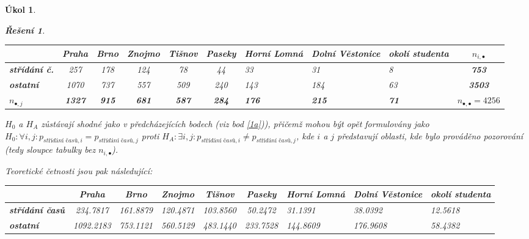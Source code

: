 \documentclass[11pt, a4paper]{article}
\theoremstyle{result}
\newtheorem*{result}{Řešení}
\newtheorem{task}{Úkol}
\begin{document}
\begin{task}
\begin{enumerate}[a)]
\begin{result}
            \begin{center}
                \begin{tabular}{ |l|c|c|c|c|c|M{1.5cm}|M{1.9cm}|M{1.8cm}|c| }
                    \hline
                    & \textbf{Praha} & \textbf{Brno} & \textbf{Znojmo} & \textbf{Tišnov} & \textbf{Paseky} & \textbf{Horní Lomná} & \textbf{Dolní Věstonice} & \textbf{okolí studenta} & \boldmath$n_{i, \bullet}$ \\
                    \hline
                    \textbf{střídání č.} & 257 & 178 & 124 & 78 & 44 & 33 & 31 & 8 & \textbf{753} \\
                    \hline
                    \textbf{ostatní} & 1070 & 737 & 557 & 509 & 240 & 143 & 184 & 63 & \textbf{3503} \\
                    \hline
                    \boldmath$n_{\bullet, j}$ & \textbf{1327} & \textbf{915} & \textbf{681} & \textbf{587} & \textbf{284} & \textbf{176} & \textbf{215} & \textbf{71} & \boldmath$n_{\bullet, \bullet} = 4256$ \\
                    \hline
                \end{tabular}
            \end{center}
        \end{result}

        $H_0$ a $H_A$ zůstávají shodné jako v předcházejících bodech (viz bod \ref{1a})), přičemž mohou být opět formulovány jako $H_0: \forall i, j: p_{\textit{střídání časů}, i} = p_{\textit{střídání časů}, j}$ proti $H_A: \exists i, j: p_{\textit{střídání časů}, i} \neq p_{\textit{střídání časů}, j}$, kde $i$ a $j$ představují oblasti, kde bylo prováděno pozorování (tedy sloupce tabulky bez $n_{i, \bullet}$).

        Teoretické četnosti jsou pak následující:

         \begin{center}
            \begin{tabular}{ |l|c|c|c|c|c|M{1.5cm}|M{1.9cm}|M{1.8cm}| }
                \hline
                & \textbf{Praha} & \textbf{Brno} & \textbf{Znojmo} & \textbf{Tišnov} & \textbf{Paseky} & \textbf{Horní Lomná} & \textbf{Dolní Věstonice} & \textbf{okolí studenta} \\
                \hline
                \textbf{střídání časů} & 234.7817 & 161.8879 & 120.4871 & 103.8560 & 50.2472 & 31.1391 & 38.0392 & 12.5618 \\
                \hline
                \textbf{ostatní} & 1092.2183 & 753.1121 & 560.5129 & 483.1440 & 233.7528 & 144.8609 & 176.9608 & 58.4382 \\
                \hline
            \end{tabular}
        \end{center}


\end{enumerate}
\end{task}
\end{document}
